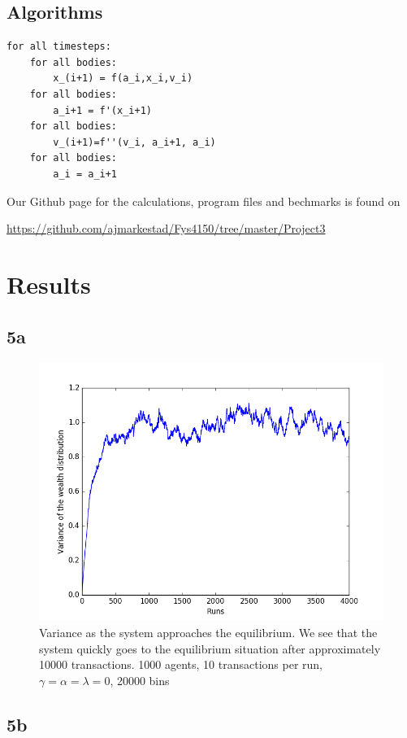 \documentclass[a4paper,11pt]{article}
\begin{document}
{\subsection*{Algorithms}

\begin{lstlisting}
for all timesteps:
	for all bodies:
		x_(i+1) = f(a_i,x_i,v_i)
	for all bodies:
		a_i+1 = f'(x_i+1)
	for all bodies:
		v_(i+1)=f''(v_i, a_i+1, a_i)
	for all bodies:
		a_i = a_i+1
\end{lstlisting}Our Github page for the calculations, program files and bechmarks is found on 

\url{https://github.com/ajmarkestad/Fys4150/tree/master/Project3}


\section*{Results}


\subsection{5a}
\begin{figure}[H]
	\centering
	\includegraphics[scale=0.5]{testinit}
	\caption{Variance as the system approaches the equilibrium. We see that the system quickly goes to the equilibrium situation after approximately 10000 transactions.  1000 agents, 10 transactions per run, $\gamma=\alpha=\lambda = 0$,  20000 bins  }
	\label{fig:testinit}
\end{figure}

\subsection{5b}




}
\end{document}
